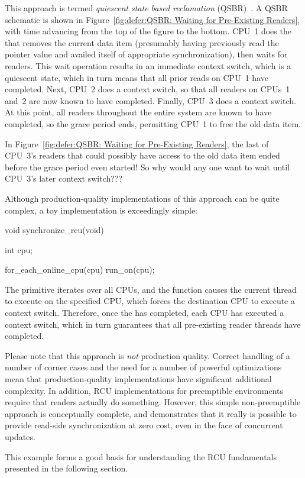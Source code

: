 This approach is termed \emph{quiescent state based reclamation}
(QSBR)~\cite{ThomasEHart2006a}.
A QSBR schematic is shown in
Figure~\ref{fig:defer:QSBR: Waiting for Pre-Existing Readers},
with time advancing from the top of the figure to the bottom.
CPU~1 does the  that removes the current data
item (presumably having previously read the pointer value and
availed itself of appropriate synchronization), then waits
for readers.
This wait operation results in an immediate context switch, which is
a quiescent state, which in turn means that all prior reads on CPU~1
have completed.
Next, CPU~2 does a context switch, so that all readers on CPUs~1 and~2
are now known to have completed.
Finally, CPU~3 does a context switch.
At this point, all readers throughout the entire system are known to
have completed, so the grace period ends, permitting CPU~1 to free
the old data item.

\QuickQuiz{}
	In Figure~\ref{fig:defer:QSBR: Waiting for Pre-Existing Readers},
	the last of CPU~3's readers that could possibly have
	access to the old data item ended before the grace period
	even started!
	So why would any one want to wait until CPU~3's later context
	switch???
 \QuickQuizEnd

Although production-quality implementations of this approach can be
quite complex, a toy implementation is exceedingly simple:

\begin{VerbatimN}[samepage=true]
void synchronize_rcu(void)
{
	int cpu;

	for_each_online_cpu(cpu)
		run_on(cpu);
}
\end{VerbatimN}

The  primitive iterates over all CPUs, and
the  function causes the current thread to execute on the
specified CPU, which forces the destination CPU to execute a context
switch.
Therefore, once the  has completed, each CPU
has executed a context switch, which in turn guarantees that
all pre-existing reader threads have completed.

Please note that this approach is \emph{not} production quality.
Correct handling of a number of corner cases and the need for a number
of powerful optimizations mean that production-quality implementations
have significant additional complexity.
In addition, RCU implementations for preemptible environments
require that readers actually do something.
However, this simple non-preemptible approach is conceptually complete,
and demonstrates that it really is possible to provide read-side
synchronization at zero cost, even in the face of concurrent updates.

This example forms a good basis for understanding the RCU fundamentals
presented in the following section.
